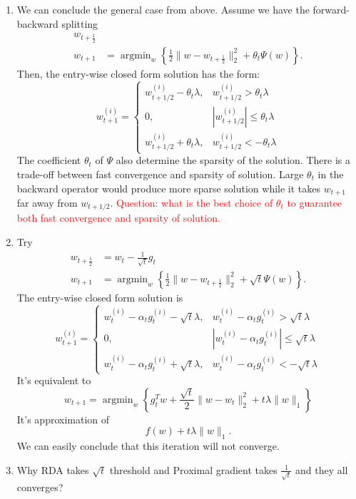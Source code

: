 \begin{enumerate}
	\item We can conclude the general case from above. 
	Assume we have the forward-backward splitting
	\begin{align}
		w_{t+\frac{1}{2}} & \\
		w_{t+1} &= \mathop{\arg \min}_w \left\{ \frac{1}{2}\|w-w_{t+\frac{1}{2}}\|^2_2 +  \theta_t\Psi(w) \right\}.
	\end{align}
	Then, the entry-wise closed form solution has the form:
	\begin{equation}
		w_{t+1}^{(i)}=
		\begin{cases}
			w_{t+1/2}^{(i)}- \theta_t \lambda, & w_{t+1/2}^{(i)} > \theta_t\lambda\\
			0, & | w_{t+1/2}^{(i)}| \leq  \theta_t \lambda\\
			w_{t+1/2}^{(i)} +\theta_t\lambda, & w_{t+1/2}^{(i)} < - \theta_t\lambda
		\end{cases}
	\end{equation}
	The coefficient $\theta_t$ of $\Psi$ also determine the sparsity of the solution.
	There is a trade-off between fast convergence and sparsity of solution.
	Large $\theta_t$ in the backward operator would produce more sparse solution while it takes $w_{t+1}$ far away from $w_{t+1/2}$.
	\textcolor{red}{Question: what is the best choice of $\theta_t$ to guarantee both fast convergence and sparsity of solution.}
	
	\item 
	Try
	\begin{equation}
		\begin{split}
			w_{t+\frac{1}{2}} &=w_t -  \frac{1}{\sqrt{t}} g_t \\
			w_{t+1} &=\mathop{\arg \min}_w \left\{ \frac{1}{2}\|w-w_{t+\frac{1}{2}}\|^2_2 +\sqrt{t} \Psi(w) \right\}.
		\end{split}
	\end{equation}
	The entry-wise closed form solution is
	\begin{equation}
		w_{t+1}^{(i)}=
		\begin{cases}
			w_t^{(i)}-\alpha_t g_t^{(i)} -\sqrt{t}\lambda, & w_t^{(i)}-\alpha_t g_t^{(i)} > \sqrt{t} \lambda\\
			0, & |w_t^{(i)}-\alpha_t g_t^{(i)}| \leq \sqrt{t} \lambda\\
			w_t^{(i)}-\alpha_t g_t^{(i)} +\sqrt{t}\lambda, & w_t^{(i)}-\alpha_t g_t^{(i)} < -\sqrt{t} \lambda
		\end{cases}
	\end{equation}
	It's equivalent to
	\begin{equation}
		w_{t+1}=\mathop{\arg \min}_w \left\lbrace g_t^T w+\frac{\sqrt{t}}{2} \|w-w_t\|^2_2 + t\lambda \|w\|_1 \right \rbrace
	\end{equation}
	It's approximation of
	\begin{equation}
		f(w) + t \lambda \|w\|_1.
	\end{equation}
	We can easily conclude that this iteration will not converge.
	
	\item Why RDA takes $\sqrt{t}$ threshold and Proximal gradient takes $\frac{1}{\sqrt{t}}$ and they all converges?
\end{enumerate}


